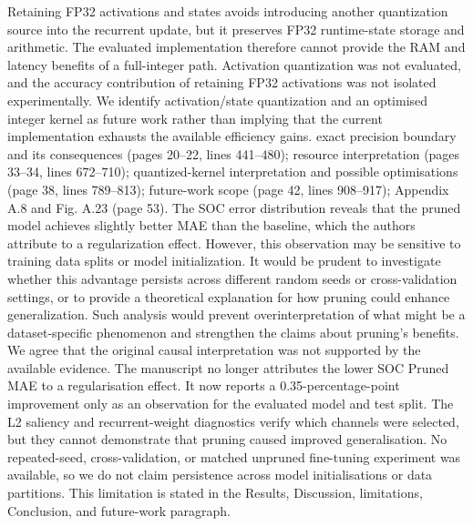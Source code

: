 {}Retaining FP32 activations and states avoids introducing another quantization source into the recurrent update, but it preserves FP32 runtime-state storage and arithmetic. The evaluated implementation therefore cannot provide the RAM and latency benefits of a full-integer path. Activation quantization was not evaluated, and the accuracy contribution of retaining FP32 activations was not isolated experimentally. We identify activation/state quantization and an optimised integer kernel as future work rather than implying that the current implementation exhausts the available efficiency gains.\markdownRendererParagraphSeparator
{} exact precision boundary and its consequences (pages 20--22, lines 441--480); resource interpretation (pages 33--34, lines 672--710); quantized-kernel interpretation and possible optimisations (page 38, lines 789--813); future-work scope (page 42, lines 908--917); Appendix A.8 and Fig. A.23 (page 53).\markdownRendererInterblockSeparator
{}
\markdownRendererSectionEnd \markdownRendererSectionBegin
{}\markdownRendererInterblockSeparator
{}\markdownRendererBlockQuoteBegin
The SOC error distribution reveals that the pruned model achieves slightly better MAE than the baseline, which the authors attribute to a regularization effect. However, this observation may be sensitive to training data splits or model initialization. It would be prudent to investigate whether this advantage persists across different random seeds or cross-validation settings, or to provide a theoretical explanation for how pruning could enhance generalization. Such analysis would prevent overinterpretation of what might be a dataset-specific phenomenon and strengthen the claims about pruning's benefits.\markdownRendererBlockQuoteEnd \markdownRendererInterblockSeparator
{} We agree that the original causal interpretation was not supported by the available evidence. The manuscript no longer attributes the lower SOC Pruned MAE to a regularisation effect. It now reports a 0.35-percentage-point improvement only as an observation for the evaluated model and test split. The L2 saliency and recurrent-weight diagnostics verify which channels were selected, but they cannot demonstrate that pruning caused improved generalisation.\markdownRendererParagraphSeparator
{}No repeated-seed, cross-validation, or matched unpruned fine-tuning experiment was available, so we do not claim persistence across model initialisations or data partitions. This limitation is stated in the Results, Discussion, limitations, Conclusion, and future-work paragraph.\markdownRendererParagraphSeparator
